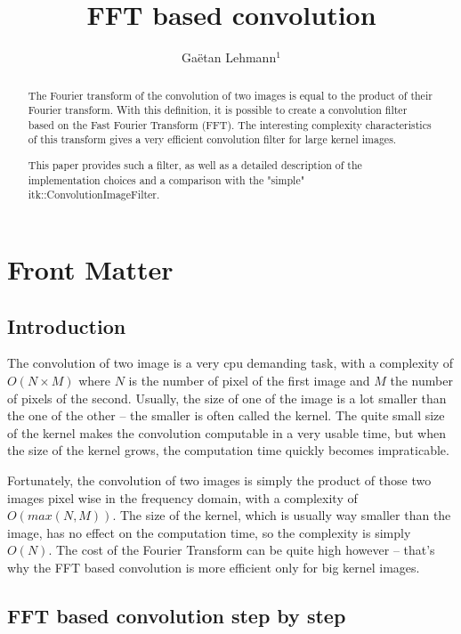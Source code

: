 \documentclass{InsightArticle}
\title{FFT based convolution}
\author{Ga\"etan Lehmann{$^1$}}
\begin{document}
\maketitle

\ifhtml
\chapter*{Front Matter\label{front}}
\fi


\begin{abstract}
\noindent

The Fourier transform of the convolution of two images is equal to the product of their
Fourier transform. With this definition, it is possible to create a convolution filter
based on the Fast Fourier Transform (FFT). The interesting complexity characteristics of
this transform gives a very efficient convolution filter for large kernel images.

This paper provides such a filter, as well as a detailed description of the implementation
choices and a comparison with the "simple" itk::ConvolutionImageFilter.

\end{abstract}

\tableofcontents

\section{Introduction}

The convolution of two image is a very cpu demanding task, with a complexity of $O(N \times M)$ where $N$ is
the number of pixel of the first image and $M$ the number of pixels of the second. Usually, the size
of one of the image is a lot smaller than the one of the other -- the smaller is often called the
kernel. The quite small size of the kernel makes the convolution computable in a very usable time,
but when the size of the kernel grows, the computation time quickly becomes impraticable.

Fortunately, the convolution of two images is simply the product of those two images pixel wise in
the frequency domain, with a complexity of $O(max(N, M))$. The size of the kernel, which is usually
way smaller than the image, has no effect on the computation time, so the complexity is simply $O(N)$.
The cost of the Fourier Transform
can be quite high however -- that's why the FFT based convolution is more efficient only for big
kernel images.

\section{FFT based convolution step by step}
\end{document}
